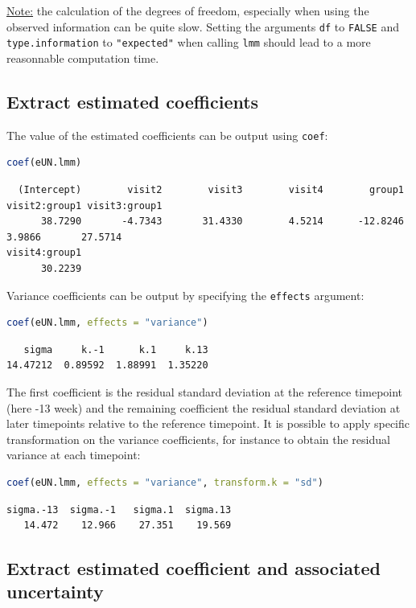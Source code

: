 \documentclass[12pt]{article}
\begin{document}
\uline{Note:} the calculation of the degrees of freedom, especially when
using the observed information can be quite slow. Setting the
arguments \texttt{df} to \texttt{FALSE} and \texttt{type.information} to \texttt{"expected"} when
calling \texttt{lmm} should lead to a more reasonnable computation time.
\subsection{Extract estimated coefficients}
\label{sec:org2134017}
The value of the estimated coefficients can be output using \texttt{coef}:
\begin{lstlisting}[language=r,numbers=none]
coef(eUN.lmm)
\end{lstlisting}

\label{}
\begin{verbatim}
  (Intercept)        visit2        visit3        visit4        group1 visit2:group1 visit3:group1 
      38.7290       -4.7343       31.4330        4.5214      -12.8246        3.9866       27.5714 
visit4:group1 
      30.2239
\end{verbatim}


Variance coefficients can be output by specifying the \texttt{effects} argument:
\begin{lstlisting}[language=r,numbers=none]
coef(eUN.lmm, effects = "variance")
\end{lstlisting}

\label{}
\begin{verbatim}
   sigma     k.-1      k.1     k.13 
14.47212  0.89592  1.88991  1.35220
\end{verbatim}


The first coefficient is the residual standard deviation at the
reference timepoint (here -13 week) and the remaining coefficient the
residual standard deviation at later timepoints relative to the
reference timepoint. It is possible to apply specific transformation
on the variance coefficients, for instance to obtain the residual
variance at each timepoint:
\begin{lstlisting}[language=r,numbers=none]
coef(eUN.lmm, effects = "variance", transform.k = "sd")
\end{lstlisting}

\label{}
\begin{verbatim}
sigma.-13  sigma.-1   sigma.1  sigma.13 
   14.472    12.966    27.351    19.569
\end{verbatim}
\subsection{Extract estimated coefficient and associated uncertainty}
\label{sec:orge3c11a4}
\end{document}
